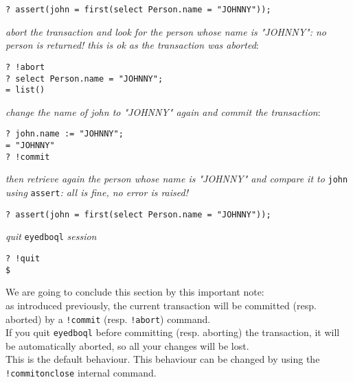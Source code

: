 \begin{verbatim}
? assert(john = first(select Person.name = "JOHNNY"));
\end{verbatim}
\emph{abort the transaction and look for the person whose name is
"JOHNNY": no person is returned! this is ok as the transaction was aborted}:
\begin{verbatim}
? !abort
? select Person.name = "JOHNNY";
= list()
\end{verbatim}
\emph{change the name of john to "JOHNNY" again and commit the transaction}:
\begin{verbatim}
? john.name := "JOHNNY";
= "JOHNNY"
? !commit
\end{verbatim}
\emph{then retrieve again the person whose name is "JOHNNY" and compare
it to} \texttt{john} \emph{using}
\texttt{assert}\emph{: all is fine, no error is raised!}
\begin{verbatim}
? assert(john = first(select Person.name = "JOHNNY"));
\end{verbatim}
\emph{quit} \texttt{eyedboql} \emph{session}
\begin{verbatim}
? !quit
$
\end{verbatim}
We are going to conclude this section by this important note:\\
as introduced previously,
the current transaction will be committed (resp. aborted) by a \texttt{!commit}
(resp. \texttt{!abort}) command.
\\
If you quit \texttt{eyedboql} before committing (resp. aborting) the transaction,
it will be automatically aborted, so all your changes will be lost.
\\
This is the default behaviour. This behaviour can be changed by using the
\texttt{!commitonclose} internal command.

